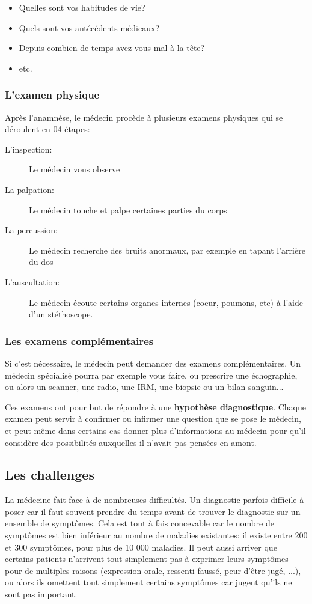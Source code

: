 \begin{itemize}
    \item Quelles sont vos habitudes de vie?
    \item Quels sont vos antécédents médicaux?
    \item Depuis combien de temps avez vous mal à la tête?
    \item etc.
\end{itemize}


\subsubsection{L'examen physique}
Après l'anamnèse, le médecin procède à plusieurs examens physiques qui se déroulent en 04 étapes:
\begin{description}
    \item[L'inspection:] Le médecin vous observe
    \item[La palpation:] Le médecin touche et palpe certaines parties du corps
    \item[La percussion:] Le médecin recherche des bruits anormaux, par exemple en tapant l'arrière du dos
    \item[L'auscultation:] Le médecin écoute certains organes internes (coeur, poumons, etc) à l'aide d'un stéthoscope.
\end{description}

\subsubsection{Les examens complémentaires}
Si c'est nécessaire, le médecin peut demander des examens complémentaires. Un médecin spécialisé pourra par exemple vous faire, ou prescrire une échographie, ou alors un scanner, une radio, une IRM, une biopsie ou un bilan sanguin...

Ces examens  ont pour but de répondre à une \textbf{hypothèse diagnostique}. Chaque examen peut servir à confirmer ou infirmer une question que se pose le médecin, et peut même dans certains cas donner plus d'informations au médecin pour qu'il considère des possibilités auxquelles il n'avait pas pensées en amont.


\subsection{Les challenges}
La médecine fait face à de nombreuses difficultés. Un diagnostic parfois difficile à poser car il faut souvent prendre du temps avant de trouver le diagnostic sur un ensemble de symptômes. Cela est tout à fais concevable car le nombre de symptômes est bien inférieur au nombre de maladies existantes: il existe entre 200 et 300 symptômes, pour plus de 10 000 maladies. Il peut aussi arriver que certains patients n'arrivent tout simplement pas à exprimer leurs symptômes pour de multiples raisons (expression orale, ressenti faussé, peur d'être jugé, ...), ou alors ils omettent tout simplement certains symptômes car jugent qu'ils ne sont pas important. 

